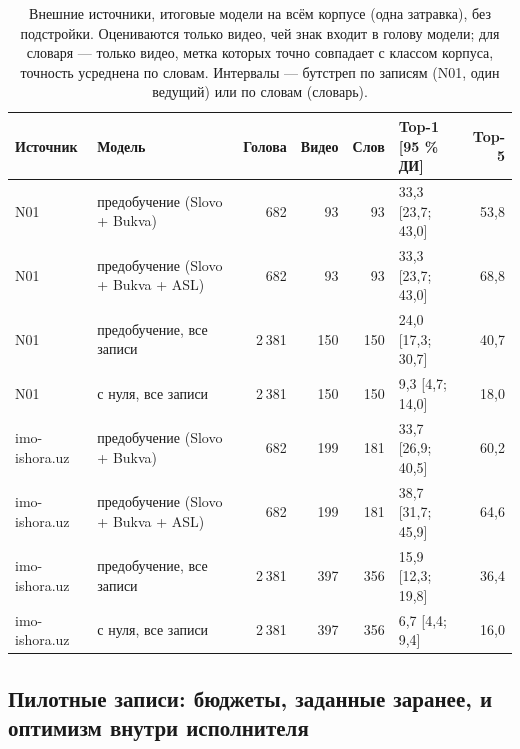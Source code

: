 \begin{table}[t]
\caption{Внешние источники, итоговые модели на всём корпусе (одна затравка), без подстройки. Оцениваются только видео, чей знак входит в голову модели; для словаря — только видео, метка которых точно совпадает с классом корпуса, точность усреднена по словам. Интервалы — бутстреп по записям (N01, один ведущий) или по словам (словарь).}\label{tab:external}
\footnotesize
\centering
\begin{tabular}{llrrrlr}
\toprule
\textbf{Источник} & \textbf{Модель} & \textbf{Голова} & \textbf{Видео} & \textbf{Слов} & \textbf{Top-1 [95 \% ДИ]} & \textbf{Top-5} \\
\midrule
N01 & предобучение (Slovo + Bukva) & 682 & 93 & 93 & 33,3 [23,7; 43,0] & 53,8 \\
N01 & предобучение (Slovo + Bukva + ASL) & 682 & 93 & 93 & 33,3 [23,7; 43,0] & 68,8 \\
N01 & предобучение, все записи & 2 381 & 150 & 150 & 24,0 [17,3; 30,7] & 40,7 \\
N01 & с нуля, все записи & 2 381 & 150 & 150 & 9,3 [4,7; 14,0] & 18,0 \\
imo-ishora.uz & предобучение (Slovo + Bukva) & 682 & 199 & 181 & 33,7 [26,9; 40,5] & 60,2 \\
imo-ishora.uz & предобучение (Slovo + Bukva + ASL) & 682 & 199 & 181 & 38,7 [31,7; 45,9] & 64,6 \\
imo-ishora.uz & предобучение, все записи & 2 381 & 397 & 356 & 15,9 [12,3; 19,8] & 36,4 \\
imo-ishora.uz & с нуля, все записи & 2 381 & 397 & 356 & 6,7 [4,4; 9,4] & 16,0 \\
\bottomrule
\end{tabular}
\end{table}

\hypertarget{ux43fux438ux43bux43eux442ux43dux44bux435-ux437ux430ux43fux438ux441ux438-ux431ux44eux434ux436ux435ux442ux44b-ux437ux430ux434ux430ux43dux43dux44bux435-ux437ux430ux440ux430ux43dux435ux435-ux438-ux43eux43fux442ux438ux43cux438ux437ux43c-ux432ux43dux443ux442ux440ux438-ux438ux441ux43fux43eux43bux43dux438ux442ux435ux43bux44f}{%
\subsection{Пилотные записи: бюджеты, заданные заранее, и оптимизм внутри исполнителя}\label{ux43fux438ux43bux43eux442ux43dux44bux435-ux437ux430ux43fux438ux441ux438-ux431ux44eux434ux436ux435ux442ux44b-ux437ux430ux434ux430ux43dux43dux44bux435-ux437ux430ux440ux430ux43dux435ux435-ux438-ux43eux43fux442ux438ux43cux438ux437ux43c-ux432ux43dux443ux442ux440ux438-ux438ux441ux43fux43eux43bux43dux438ux442ux435ux43bux44f}}

